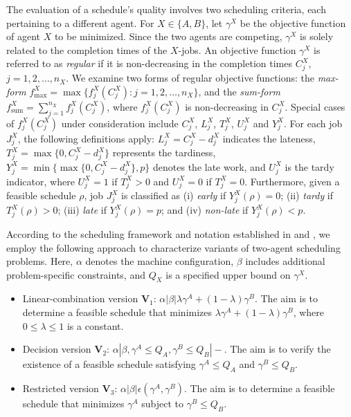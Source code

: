 \documentclass[12pt]{article}
\begin{document}
\begin{sloppypar}
The evaluation of a schedule's quality involves two scheduling criteria, each pertaining to a different agent. For $X \in \{A, B\}$, let $\gamma^X$ be the objective function of agent $X$ to be minimized. Since the two agents are competing, $\gamma^X$ is solely related to the completion times of the $X$-jobs. An objective function $\gamma^X$ is referred to as \emph{regular} if it is non-decreasing in the completion times $C_j^X$, $j=1, 2, \ldots, n_X$. We examine two forms of regular objective functions: the \emph{max-form} $f_{\max}^{X}=\max\{f_j^X(C_j^X): j=1, 2, \ldots, n_X\}$, and the \emph{sum-form} $f_{\mathrm{sum}}^{X}=\sum_{j=1}^{n_X}f_j^X(C_j^X)$, where $f_j^X(C_j^X)$ is non-decreasing in $C_j^X$. Special cases of $f_j^X(C_j^X)$ under consideration include $C_j^X$, $L_j^X$, $T_j^X$, $U_j^X$ and $Y_j^X$. For each job $J_j^X$, the following definitions apply: $L_j^{X}=C_j^{X}-d_j^{X}$ indicates the lateness, $T_j^{X}=\max \{0, C_j^{X}-d_j^{X}\}$ represents the tardiness, $Y_j^X=\min\{\max \{0, C_j^{X}-d_j^{X}\}, p\}$ denotes the late work, and $U_j^{X}$ is the tardy indicator, where $U_j^X=1$ if $T_j^X > 0$ and $U_j^X=0$ if $T_j^X = 0$. Furthermore, given a feasible schedule $\rho$, job $J_j^X$ is classified as (i) \emph{early} if $Y_j^X(\rho)=0$; (ii) \emph{tardy} if $T_j^X(\rho)>0$; (iii) \emph{late} if $Y_j^X(\rho)=p$; and (iv) \emph{non-late} if $Y_j^X(\rho)< p$.

According to the scheduling framework and notation established in \cite{TkindtBillaut2006book} and \cite{AgnetisBillaut2014Springer}, we employ the following approach to characterize variants of two-agent scheduling problems. Here, $\alpha$ denotes the machine configuration, $\beta$ includes additional problem-specific constraints, and $Q_X$ is a specified upper bound on $\gamma^X$. 

\begin{itemize}
\item Linear-combination version $\mathbf{V}_1$: $\alpha| \beta | \lambda \gamma^A+(1-\lambda)\gamma^B$. The aim is to determine a feasible
schedule that minimizes $\lambda \gamma^A+(1-\lambda)\gamma^B$, where $0 \leq \lambda \leq 1$ is a constant.

\item Decision version $\mathbf{V}_2$: $\alpha | \beta, \gamma^A \leq Q_A, \gamma^B \leq Q_B |-$. The aim is to verify the existence of a feasible schedule satisfying $\gamma^A \leq Q_A$ and $\gamma^B \leq Q_B$. 

\item Restricted version $\mathbf{V}_3$: $\alpha| \beta | \epsilon(\gamma^A, \gamma^B)$. The aim is to determine a feasible schedule that minimizes $\gamma^A$ subject to $\gamma^B \leq Q_B$.


\end{itemize}
\end{sloppypar}
\end{document}
